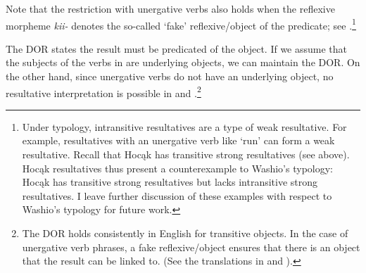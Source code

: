 \documentclass[output=paper]{LSP/langsci}
\begin{document}
\begin{exe}
\ex\label{ex:rosen:20}
\begin{xlist}



\end{xlist}
\end{exe}

Note that the restriction with unergative verbs also holds when the reflexive morpheme \textit{kii-} denotes the so-called `fake' reflexive/object of the predicate; see .\footnote{Under  typology, intransitive resultatives are a type of weak resultative. For example, resultatives with an unergative verb like `run' can form a weak resultative. Recall that Hocąk has transitive strong resultatives (see  above). Hocąk resultatives thus present a counterexample to Washio's typology: Hocąk has transitive strong resultatives but lacks intransitive strong resultatives. I leave further discussion of these examples with respect to Washio's typology for future work.}

\begin{exe}


\end{exe}

The DOR states the result must be predicated of the object. If we assume that the subjects of the verbs in  are underlying objects, we can maintain the DOR. On the other hand, since unergative verbs do not have an underlying object, no resultative interpretation is possible in  and .\footnote{The DOR holds consistently in English for transitive objects. In the case of unergative verb phrases, a fake reflexive/object ensures that there is an object that the result can be linked to. (See the translations in  and ).}
\end{document}
